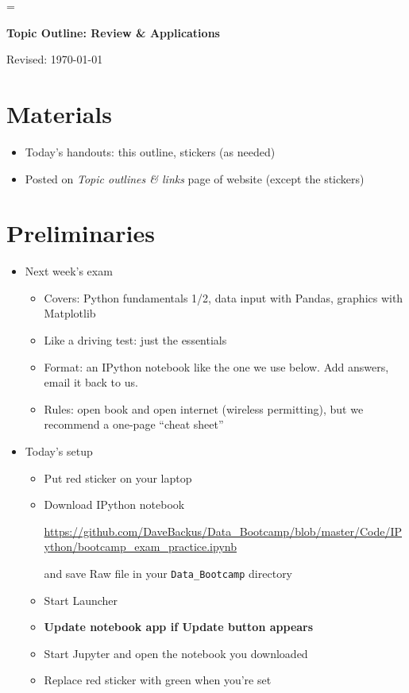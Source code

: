 \documentclass[11pt]{article}
\begin{document}
\parskip=\bigskipamount
\parindent=0.0in
\thispagestyle{empty}


\bigskip\bigskip
\centerline{\Large \bf Topic Outline:  Review \& Applications}
\centerline{Revised: \today}

\section*{Materials}

\begin{itemize}
\item  Today's handouts:  this outline, stickers (as needed)
\item  Posted on {\it Topic outlines \& links\/} page of website (except the stickers)
\end{itemize}

\section*{Preliminaries}

\begin{itemize}
\item Next week's exam
\begin{itemize}
\item Covers:  Python fundamentals 1/2, data input with Pandas, graphics with Matplotlib
\item Like a driving test:  just the essentials
\item Format:  an IPython notebook like the one we use below.  Add answers, email it back to us.  
\item Rules:  open book and open internet (wireless permitting), but we recommend a one-page ``cheat sheet''
\end{itemize}

\item Today's setup
\begin{itemize}
\item Put red sticker on your laptop

\item Download IPython notebook

\url{https://github.com/DaveBackus/Data_Bootcamp/blob/master/Code/IPython/bootcamp_exam_practice.ipynb} %

and save Raw file in your \verb|Data_Bootcamp| directory
\item Start Launcher
\item {\bf Update notebook app if Update button appears}  
\item Start Jupyter and open the notebook you downloaded 
\item Replace red sticker with green when you're set
\end{itemize}

\end{itemize}
\end{document}
